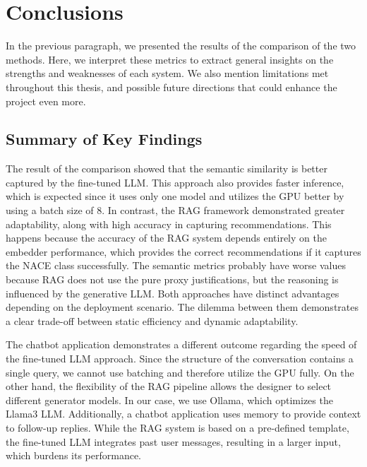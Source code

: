 \section{Conclusions}

In the previous paragraph, we presented the results of the comparison of the two methods. Here, we interpret these metrics to extract general insights on the strengths and weaknesses of each system. We also mention limitations met throughout this thesis, and possible future directions that could enhance the project even more.

\subsection{Summary of Key Findings}


The result of the comparison showed that the semantic similarity is better captured by the fine-tuned LLM. This approach also provides faster inference, which is expected since it uses only one model and utilizes the GPU better by using a batch size of 8. In contrast, the RAG framework demonstrated greater adaptability, along with high accuracy in capturing recommendations. This happens because the accuracy of the RAG system depends entirely on the embedder performance, which provides the correct recommendations if it captures the NACE class successfully. The semantic metrics probably have worse values because RAG does not use the pure proxy justifications, but the reasoning is influenced by the generative LLM. Both approaches have distinct advantages depending on the deployment scenario. The dilemma between them demonstrates a clear trade-off between static efficiency and dynamic adaptability.

The chatbot application demonstrates a different outcome regarding the speed of the fine-tuned LLM approach. Since the structure of the conversation contains a single query, we cannot use batching and therefore utilize the GPU fully. On the other hand, the flexibility of the RAG pipeline allows the designer to select different generator models. In our case, we use Ollama, which optimizes the Llama3 LLM. Additionally, a chatbot application uses memory to provide context to follow-up replies. While the RAG system is based on a pre-defined template, the fine-tuned LLM integrates past user messages, resulting in a larger input, which burdens its performance.

